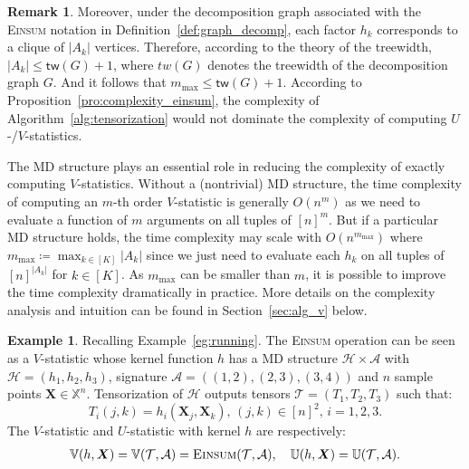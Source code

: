 \documentclass[sn-mathphys, natbib=false]{sn-jnl}
\theoremstyle{plain}
\theoremstyle{definition}
\newtheorem{remark}{Remark}
\newtheorem{subexample}{Example}
\def\Einsum{\textsc{Einsum}}
\newcommand{\ustat}{\mathbb{U}}
\newcommand{\vstat}{\mathbb{V}}
\newcommand{\samplespace}{\bbX}
\newcommand{\treewidth}{\mathsf{tw}}
\newcommand{\less}{O}
\newcommand{\Lin}[1]{{\color{purple}{#1}}}
\def\bbX{\mathbb{X}}
\def\calA{\mathcal{A}}
\def\calT{\mathcal{T}}
\def\calH{\mathcal{H}}
\begin{document}
\begin{bibunit}[agsm]
\begin{remark}
{Moreover, under the decomposition graph associated with the \Einsum{} notation in Definition~\ref{def:graph_decomp}, each factor $h_k$ corresponds to a clique of $|A_k|$ vertices. Therefore, according to the theory of the treewidth, $|A_k| \leq \treewidth(G) +1$, where $tw(G)$ denotes the treewidth of the decomposition graph $G$. And it follows that $m_{\max{}} \leq \treewidth(G) +1$. According to Proposition~\ref{pro:complexity_einsum}, the complexity of Algorithm~\ref{alg:tensorization} would not dominate the complexity of computing $U$-/$V$-statistics. 
}
\end{remark}

The MD structure plays an essential role in reducing the complexity of exactly computing $V$-statistics. %
Without a (nontrivial) MD structure, the time complexity of computing an $m$-th order $V$-statistic is generally $\less (n^m)$ as we need to evaluate a function of $m$ arguments on all tuples of $[n]^m$. But if a particular MD structure holds, the time complexity may scale with $\less (n^{m_{\mathrm{max}}})$ where $m_{\mathrm{max}} \coloneqq \max_{k \in [K]} |A_k|$ since we just need to evaluate each  $h_k$ on all tuples of $[n]^{|A_k|}$ for $k \in [K]$. As $m_{\mathrm{max}}$ can be smaller than $m$, it is possible to improve the time complexity dramatically in practice. More details on the complexity analysis and intuition can be found in Section~\ref{sec:alg_v} below.

\setcounter{example}{1}
\begin{subexample}
\label{eg:running-a}
Recalling Example~\ref{eg:running}. The \Einsum{} operation can be seen as a $V$-statistic whose kernel function $h$ has a MD structure $\calH \times \calA$ with $\calH = (h_1, h_2, h_3)$, signature $\calA = ( (1,2),(2,3),(3,4))$ and $n$ sample points $\bm{X} \in \samplespace^{n}$. Tensorization of $\calH$ outputs tensors $\calT = ( T_1, T_2, T_3)$ such that:
\begin{equation*}
T_i (j,k) = h_i (\bm{X}_{j}, \bm{X}_{k}),  \, (j,k) \in [n]^2,  \, i = 1,2,3.
\end{equation*}
The $V$-statistic and $U$-statistic with kernel $h$ are respectively:
\begin{align*}
\vstat(h, \bm{X}) = \vstat (\calT, \calA) = \Einsum{}(\calT, \calA), \quad \ustat(h, \bm{X}) = \ustat(\calT, \calA).
\end{align*}
\end{subexample}




\end{bibunit}
\end{document}
